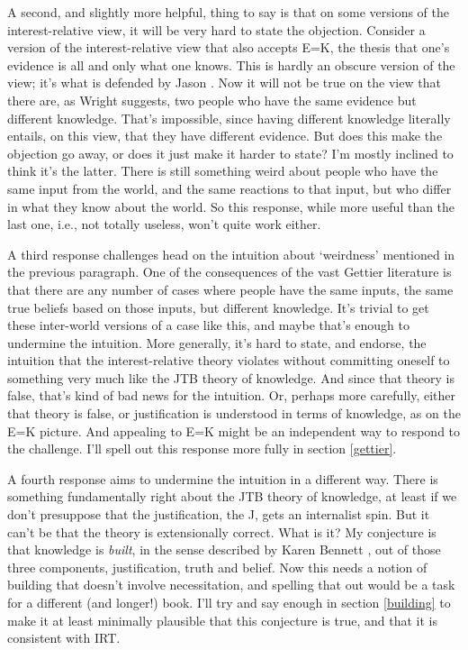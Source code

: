 \documentclass[
  11pt,
]{book}
\begin{document}
A second, and slightly more helpful, thing to say is that on some versions of the interest-relative view, it will be very hard to state the objection. Consider a version of the interest-relative view that also accepts E=K, the thesis that one's evidence is all and only what one knows. This is hardly an obscure version of the view; it's what is defended by Jason \citet{Stanley2005}. Now it will not be true on the view that there are, as Wright suggests, two people who have the same evidence but different knowledge. That's impossible, since having different knowledge literally entails, on this view, that they have different evidence. But does this make the objection go away, or does it just make it harder to state? I'm mostly inclined to think it's the latter. There is still something weird about people who have the same input from the world, and the same reactions to that input, but who differ in what they know about the world. So this response, while more useful than the last one, i.e., not totally useless, won't quite work either.

A third response challenges head on the intuition about `weirdness' mentioned in the previous paragraph. One of the consequences of the vast Gettier literature is that there are any number of cases where people have the same inputs, the same true beliefs based on those inputs, but different knowledge. It's trivial to get these inter-world versions of a case like this, and maybe that's enough to undermine the intuition. More generally, it's hard to state, and endorse, the intuition that the interest-relative theory violates without committing oneself to something very much like the JTB theory of knowledge. And since that theory is false, that's kind of bad news for the intuition. Or, perhaps more carefully, either that theory is false, or justification is understood in terms of knowledge, as on the E=K picture. And appealing to E=K might be an independent way to respond to the challenge. I'll spell out this response more fully in section \ref{gettier}.

A fourth response aims to undermine the intuition in a different way. There is something fundamentally right about the JTB theory of knowledge, at least if we don't presuppose that the justification, the J, gets an internalist spin. But it can't be that the theory is extensionally correct. What is it? My conjecture is that knowledge is \emph{built}, in the sense described by Karen Bennett \citeyearpar{Bennett2017}, out of those three components, justification, truth and belief. Now this needs a notion of building that doesn't involve necessitation, and spelling that out would be a task for a different (and longer!) book. I'll try and say enough in section \ref{building} to make it at least minimally plausible that this conjecture is true, and that it is consistent with IRT.
\end{document}
